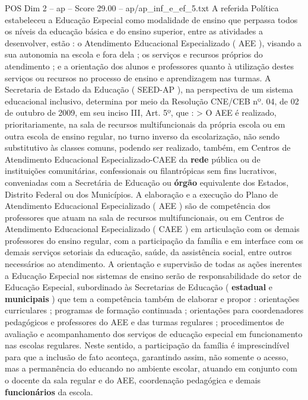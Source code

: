 \begin{textsample}{POS Dim 2 – ap – Score 29.00 – ap/ap\_inf\_e\_ef\_5.txt}
A referida Política estabeleceu a Educação Especial como modalidade de ensino que perpassa todos os níveis da educação básica e do ensino superior, entre as atividades a desenvolver, estão : o Atendimento Educacional Especializado ( AEE ), visando a sua autonomia na escola e fora dela ; os serviços e recursos próprios do atendimento ; e a orientação dos alunos e professores quanto à utilização destes serviços ou recursos no processo de ensino e aprendizagem nas turmas.
A Secretaria de Estado da Educação ( SEED-AP ), na perspectiva de um sistema educacional inclusivo, determina por meio da Resolução CNE/CEB nº. 04, de 02 de outubro de 2009, em seu inciso III, Art. 5º, que : > O AEE é realizado, prioritariamente, na sala de recursos multifuncionais da própria escola ou em outra escola de ensino regular, no turno inverso da escolarização, não sendo substitutivo às classes comuns, podendo ser realizado, também, em Centros de Atendimento Educacional Especializado-CAEE da \textbf{rede} pública ou de instituições comunitárias, confessionais ou filantrópicas sem fins lucrativos, conveniadas com a Secretária de Educação ou \textbf{órgão} equivalente dos Estados, Distrito Federal ou dos Municípios.
A elaboração e a execução do Plano de Atendimento Educacional Especializado ( AEE ) são de competência dos professores que atuam na sala de recursos multifuncionais, ou em Centros de Atendimento Educacional Especializado ( CAEE ) em articulação com os demais professores do ensino regular, com a participação da família e em interface com os demais serviços setoriais da educação, saúde, da assistência social, entre outros necessários ao atendimento.
A orientação e supervisão de todas as ações inerentes a Educação Especial nos sistemas de ensino serão de responsabilidade do setor de Educação Especial, subordinado às Secretarias de Educação ( \textbf{estadual} e \textbf{municipais} ) que tem a competência também de elaborar e propor : orientações curriculares ; programas de formação continuada ; orientações para coordenadores pedagógicos e professores do AEE e das turmas regulares ; procedimentos de avaliação e acompanhamento dos serviços de educação especial em funcionamento nas escolas regulares.
Neste sentido, a participação da família é imprescindível para que a inclusão de fato aconteça, garantindo assim, não somente o acesso, mas a permanência do educando no ambiente escolar, atuando em conjunto com o docente da sala regular e do AEE, coordenação pedagógica e demais \textbf{funcionários} da escola.

\end{textsample}
